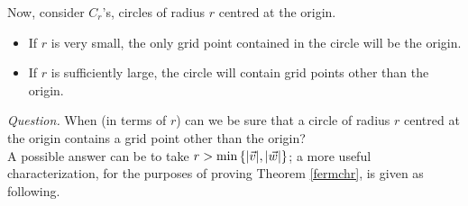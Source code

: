 Now, consider $C_r$'s, circles of radius $r$ centred at the origin. 
\begin{itemize}
\item If $r$ is very small, the only grid point contained in the circle will be the origin.
\item If $r$ is sufficiently large, the circle will contain grid points other than the origin.
\end{itemize}
\emph{Question.} When (in terms of $r$) can we be sure that a circle of radius $r$ centred at the origin contains a grid point other than the origin?\\[1em]
A possible answer can be to take $r > \min\left\{|\vec{v}|,|\vec{w}|\right\}$; a more useful characterization, for the purposes of proving Theorem \ref{fermchr}, is given as following.

\vspace*{1.5em}

